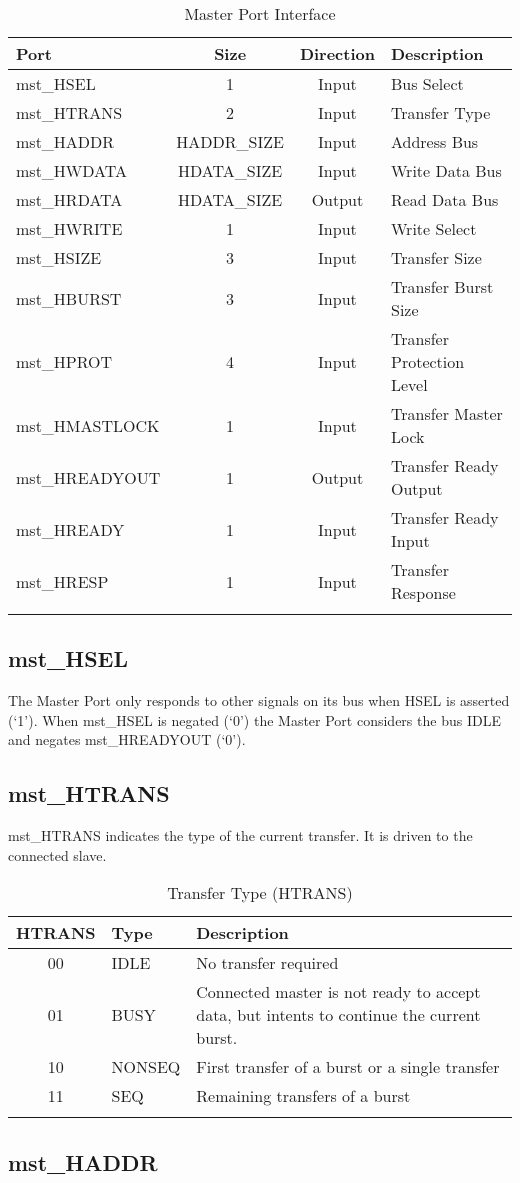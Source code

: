 \begin{longtable}[]{@{}lccl@{}}
\toprule
Port & Size & Direction & Description\tabularnewline
\midrule
\endhead
mst\_HSEL & 1 & Input & Bus Select\tabularnewline
mst\_HTRANS & 2 & Input & Transfer Type\tabularnewline
mst\_HADDR & HADDR\_SIZE & Input & Address Bus\tabularnewline
mst\_HWDATA & HDATA\_SIZE & Input & Write Data Bus\tabularnewline
mst\_HRDATA & HDATA\_SIZE & Output & Read Data Bus\tabularnewline
mst\_HWRITE & 1 & Input & Write Select\tabularnewline
mst\_HSIZE & 3 & Input & Transfer Size\tabularnewline
mst\_HBURST & 3 & Input & Transfer Burst Size\tabularnewline
mst\_HPROT & 4 & Input & Transfer Protection Level\tabularnewline
mst\_HMASTLOCK & 1 & Input & Transfer Master Lock\tabularnewline
mst\_HREADYOUT & 1 & Output & Transfer Ready Output\tabularnewline
mst\_HREADY & 1 & Input & Transfer Ready Input\tabularnewline
mst\_HRESP & 1 & Input & Transfer Response\tabularnewline
\bottomrule
\caption{Master Port Interface}
\end{longtable}

\subsection{mst\_HSEL}\label{mst_hsel}

The Master Port only responds to other signals on its bus when HSEL is
asserted (`1'). When mst\_HSEL is negated (`0') the Master Port
considers the bus IDLE and negates mst\_HREADYOUT (`0').

\subsection{mst\_HTRANS}\label{mst_htrans}

mst\_HTRANS indicates the type of the current transfer. It is driven to
the connected slave.

\begin{longtable}[]{@{}clp{9cm}@{}}
\toprule
HTRANS & Type & Description\tabularnewline
\midrule
\endhead
00 & IDLE & No transfer required\tabularnewline
01 & BUSY & Connected master is not ready to accept data, but intents to
continue the current burst.\tabularnewline
10 & NONSEQ & First transfer of a burst or a single
transfer\tabularnewline
11 & SEQ & Remaining transfers of a burst\tabularnewline
\bottomrule
\caption{Transfer Type (HTRANS)}
\end{longtable}


\subsection{mst\_HADDR}\label{mst_haddr}

